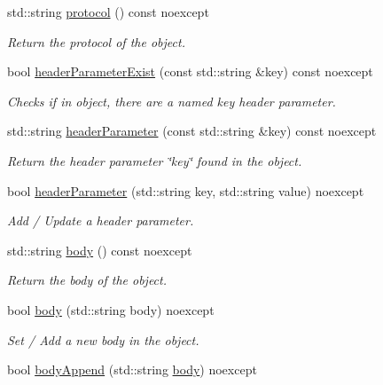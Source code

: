 \begin{DoxyCompactItemize}
\mbox{\label{classHttpResponse_a1fde59ad363da86edb45efc6b7844e64}} 
std\+::string \hyperlink{classHttpResponse_a1fde59ad363da86edb45efc6b7844e64}{protocol} () const noexcept
\begin{DoxyCompactList}\small\item\em Return the protocol of the object. \end{DoxyCompactList}\item 
bool \hyperlink{classHttpResponse_ae119bd9c54b39e392b2fd87c3012f53e}{header\+Parameter\+Exist} (const std\+::string \&key) const noexcept
\begin{DoxyCompactList}\small\item\em Checks if in object, there are a named \textquotesingle{}key\textquotesingle{} header parameter. \end{DoxyCompactList}\item 
std\+::string \hyperlink{classHttpResponse_a257c44a876f78e131e32d5af9f81d4fc}{header\+Parameter} (const std\+::string \&key) const noexcept
\begin{DoxyCompactList}\small\item\em Return the header parameter \char`\"{}key\char`\"{} found in the object. \end{DoxyCompactList}\item 
bool \hyperlink{classHttpResponse_a193cf7b72bfedfc7f37318aff1d55158}{header\+Parameter} (std\+::string key, std\+::string value) noexcept
\begin{DoxyCompactList}\small\item\em Add / Update a header parameter. \end{DoxyCompactList}\item 
std\+::string \hyperlink{classHttpResponse_a696715c993a4ec50a609efcd43d98a62}{body} () const noexcept
\begin{DoxyCompactList}\small\item\em Return the body of the object. \end{DoxyCompactList}\item 
bool \hyperlink{classHttpResponse_a26f66b018b250a0ee37859730e131404}{body} (std\+::string body) noexcept
\begin{DoxyCompactList}\small\item\em Set / Add a new body in the object. \end{DoxyCompactList}\item 
bool \hyperlink{classHttpResponse_af8f8669568d6bcc7b0e3c7a247e456bd}{body\+Append} (std\+::string \hyperlink{classHttpResponse_a696715c993a4ec50a609efcd43d98a62}{body}) noexcept

\end{DoxyCompactItemize}
